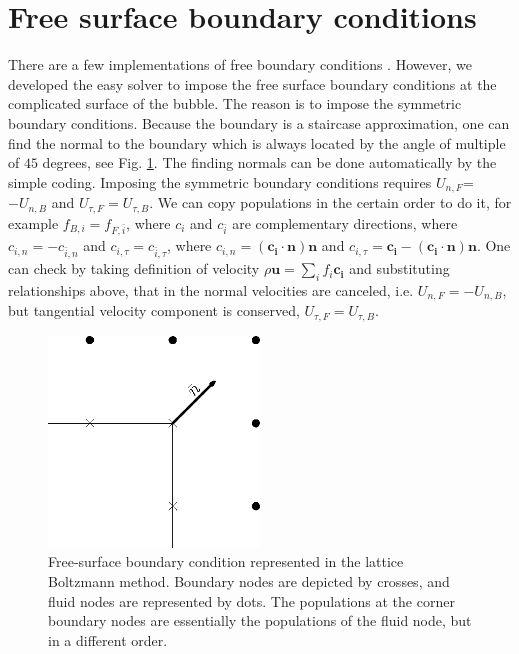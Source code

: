 \documentclass[review,12pt]{elsarticle}
\begin{document}
\section{Free surface boundary conditions}
\label{appendix-free-surface}
There are a few implementations of free boundary conditions \cite{ginzburg-free,verberg-free}.
However, we developed the easy solver to impose the free surface boundary conditions at the
complicated surface of the bubble. The reason is to impose the symmetric boundary conditions.
Because the boundary is a staircase approximation, one can find the normal to the boundary which
is always located by the angle of multiple of $45$ degrees, see Fig. \ref{fig:free:surface}. {\color{red} The finding normals
can be done automatically by the simple coding.} Imposing the
symmetric boundary conditions requires $U_{n,F}$=$-U_{n,B}$ and $U_{\tau,F}=U_{\tau,B}$. We can copy
populations in the certain order to do it, for example $f_{B,i}=f_{F,\bar{i}}$, where $c_i$ and
$c_{\bar{i}}$ are complementary directions, where $c_{i,n}=-c_{\bar{i},n}$ and
$c_{i,\tau}=c_{\bar{i},\tau}$, where $c_{i,n}=(\bm{c_i} \cdot \bm{n})\bm{n}$ and
$c_{i,\tau}=\bm{c_i}-(\bm{c_i}\cdot \bm{n})\bm{n}$. {\color{red} One can check by taking definition of velocity $\rho \bm{u}=\sum_i{f_i \bm{c_i}}$ and substituting relationships above, that in the normal velocities are canceled, i.e. $U_{n,F}=-U_{n,B}$, but tangential velocity component is conserved, $U_{\tau,F}=U_{\tau,B}$.}
\begin{figure}
\includegraphics[width=0.5\textwidth]{free_surface.eps}
\caption{Free-surface boundary condition represented in the lattice Boltzmann method. 
Boundary nodes are depicted by crosses, and fluid nodes are represented by dots.
The populations at the corner boundary nodes are 
essentially the populations of the fluid node, but in a different order. \label{fig:free:surface}}
\end{figure}


\end{document}
